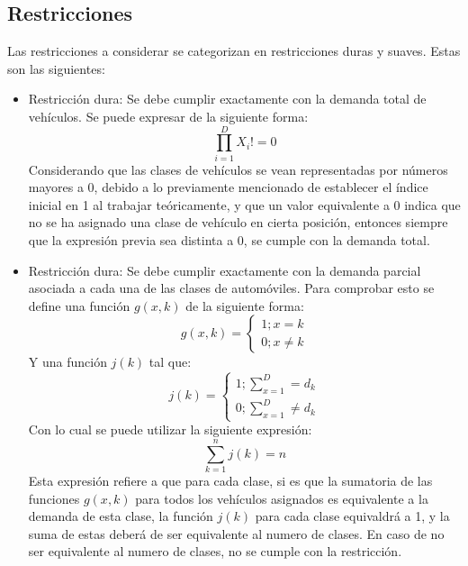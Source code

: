 \documentclass[letter, 10pt]{article}
\begin{document}
\subsection{Restricciones}
Las restricciones a considerar se categorizan en restricciones duras y suaves. Estas son las siguientes:
\begin{itemize}
    \item Restricción dura: Se debe cumplir exactamente con la demanda total de vehículos. Se puede expresar de la siguiente forma:
    \begin{equation*}
        \prod_{i=1}^{D} X_i != 0
    \end{equation*}
    Considerando que las clases de vehículos se vean representadas por números mayores a 0, debido a lo previamente mencionado de establecer el índice inicial en 1 al trabajar teóricamente, y que un valor equivalente a 0 indica que no se ha asignado una clase de vehículo en cierta posición, entonces siempre que la expresión previa sea distinta a 0, se cumple con la demanda total.
    \item Restricción dura: Se debe cumplir exactamente con la demanda parcial asociada a cada una de las clases de automóviles. Para comprobar esto se define una función $g(x, k)$ de la siguiente forma:
    \begin{equation*}
        g(x,k) = \begin{cases}
            1 ; x = k\\
            0 ; x \neq k
        \end{cases}
    \end{equation*}
    Y una función $j(k)$ tal que:
    \begin{equation*}
        j(k) = \begin{cases}
            1 ; \sum_{x=1}^{D} = d_k\\
            0 ; \sum_{x=1}^{D} \neq d_k
        \end{cases}
    \end{equation*}
    Con lo cual se puede utilizar la siguiente expresión:
    \begin{equation*}
        \sum_{k=1}^{n} j(k) = n
    \end{equation*}
    Esta expresión refiere a que para cada clase, si es que la sumatoria de las funciones $g(x,k)$ para todos los vehículos asignados es equivalente a la demanda de esta clase, la función $j(k)$ para cada clase equivaldrá a 1, y la suma de estas deberá de ser equivalente al numero de clases. En caso de no ser equivalente al numero de clases, no se cumple con la restricción.

\end{itemize}
\end{document}
